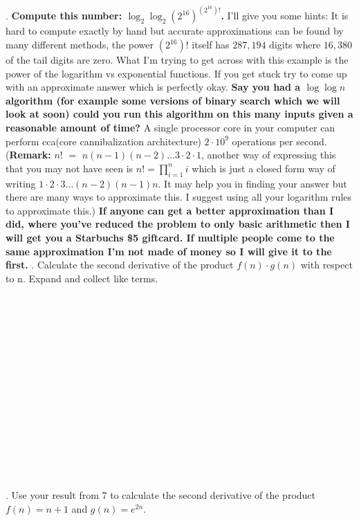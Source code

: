\documentclass[12pt]{article}
\begin{document}
\newpage
{}. \textbf{Compute this number: $\log_{2}{\log_{2}{(2^{16})^{(2^{16})!}}}$.} I'll give you some hints:
It is hard to compute exactly by hand but accurate approximations can be found by many different methods, the power $(2^{16})!$ itself has $287,194$ digits where $16,380$ of the tail digits are zero. 
What I'm trying to get across with this example is the power of the logarithm vs exponential functions. If you get stuck try to come up
with an approximate answer which is perfectly okay. \textbf{Say you had a $\log{\log{n}}$ algorithm (for example some versions of binary search 
which we will look at soon) could you
run this algorithm on this many inputs given a reasonable amount of time?} A single processor core in your computer can perform cca(core cannibalization architecture) $2 \cdot 10^9$ operations per second.
(\textbf{Remark:} $n!$ $=$ $n(n-1)(n-2) \dots 3 \cdot 2 \cdot 1$, another way of expressing this that you may not have seen is $n! = \prod\limits_{i = 1}^{n}i$ which is just a closed form way of writing $1 \cdot 2  \cdot  3 \dots (n-2)(n-1)n$. 
It may help you in finding your answer but there are many ways to approximate this. I suggest using all your logarithm
rules to approximate this.)
\textbf{If anyone can get a better approximation than I did, where you've reduced the problem to
only basic arithmetic then I will get you a Starbuchs \$5 giftcard. If multiple people come to the same 
approximation I'm not made of money so I will give it to the first.}
\newpage
{}. Calculate the second derivative of the product $f(n) \cdot g(n)$ with respect to n. Expand and collect like terms.\\\\\\\\\\\\\\\\\\\\\\\\\\\\\\\\
. Use your result from 7 to calculate the second derivative of the product $f(n) = n + 1$ and $g(n)=e^{2n}$.\\\\\\\\\\\\\\\\\\\\\\\\
\end{document}
